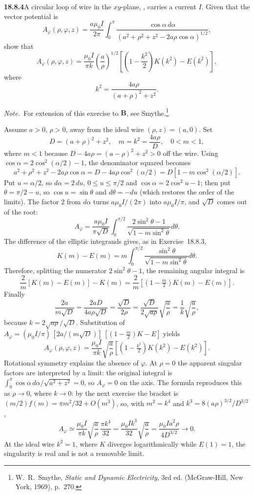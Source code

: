 \par\bigskip
\noindent\textbf{18.8.4}\quad A circular loop of wire in the
$xy$-plane, , carries a current $I$. Given
that the vector potential is
\[
A_{\varphi}(\rho,\varphi,z)
=\frac{a\mu_{0}I}{2\pi}\int_{0}^{\pi}
\frac{\cos\alpha\,d\alpha}
{(a^{2}+\rho^{2}+z^{2}-2a\rho\cos\alpha)^{1/2}},
\]
show that
\[
A_{\varphi}(\rho,\varphi,z)
=\frac{\mu_{0}I}{\pi k}\left(\frac{a}{\rho}\right)^{1/2}
\left[\left(1-\frac{k^{2}}{2}\right)K(k^{2})-E(k^{2})\right],
\]
where
\[
k^{2}=\frac{4a\rho}{(a+\rho)^{2}+z^{2}}.
\]
\par\emph{Note.}~For extension of this exercise to $\mathbf{B}$, see
Smythe.\footnote{W.~R.~Smythe, \emph{Static and Dynamic Electricity}, 3rd ed. (McGraw-Hill, New York, 1969), p.~270.}
\par\nobreak
\solution
Assume $a>0$, $\rho>0$, away from the ideal wire
$(\rho,z)=(a,0)$.  Set
\[
D=(a+\rho)^2+z^2,\quad m=k^2=\frac{4a\rho}D,
\quad 0<m<1,
\]
where $m<1$ because $D-4a\rho=(a-\rho)^2+z^2>0$ off the wire.
Using $\cos\alpha=2\cos^2(\alpha/2)-1$, the denominator
squared becomes
\[
a^2+\rho^2+z^2-2a\rho\cos\alpha
 =D-4a\rho\cos^2(\alpha/2)
 =D[1-m\cos^2(\alpha/2)].
\]
Put $u=\alpha/2$, so $d\alpha=2\,du$, $0\le u\le\pi/2$ and
$\cos\alpha=2\cos^2u-1$; then put $\theta=\pi/2-u$, so
$\cos u=\sin\theta$ and $d\theta=-du$ (which restores the order of
the limits).  The factor $2$ from $d\alpha$ turns
$a\mu_0I/(2\pi)$ into $a\mu_0I/\pi$, and $\sqrt D$ comes out of the
root:
\[
A_\varphi=\frac{a\mu_0 I}{\pi\sqrt D}
 \int_0^{\pi/2}\frac{2\sin^2\theta-1}
                         {\sqrt{1-m\sin^2\theta}}d\theta.
\]
The difference of the elliptic integrands gives, as in
Exercise~18.8.3,
\[
K(m)-E(m)=m\int_0^{\pi/2}
 \frac{\sin^2\theta}{\sqrt{1-m\sin^2\theta}}d\theta.
\]
Therefore, splitting the numerator $2\sin^2\theta-1$, the remaining
angular integral is
\[
\frac2m[K(m)-E(m)]-K(m)
 =\frac2m\left[(1-\tfrac m2)K(m)-E(m)\right].
\]
Finally
\[
\frac{2a}{m\sqrt D}
 =\frac{2aD}{4a\rho\sqrt D}=\frac{\sqrt D}{2\rho}
 =\frac{\sqrt D}{2\sqrt{a\rho}}\sqrt{\frac a\rho}
 =\frac1k\sqrt{\frac a\rho},
\]
because $k=2\sqrt{a\rho}/\sqrt D$.  Substitution of
$A_\varphi=(\mu_0I/\pi)\,[2a/(m\sqrt D)]\,
[(1-\tfrac m2)K-E]$ yields
\[
\boxed{A_\varphi(\rho,\varphi,z)=\frac{\mu_0I}{\pi k}
 \sqrt{\frac a\rho}
 \left[(1-\tfrac{k^2}2)K(k^2)-E(k^2)\right]}.
\]
Rotational symmetry explains the absence of $\varphi$.
At $\rho=0$ the apparent singular factors are interpreted
by a limit: the original integral is
$\int_0^\pi\cos\alpha\,d\alpha/\sqrt{a^2+z^2}=0$, so $A_\varphi=0$
on the axis.  The formula reproduces this as $\rho\to0$, where
$k\to0$: by the next exercise the bracket is
$(m/2)f(m)=\pi m^2/32+O(m^3)$, so, with $m^2=k^4$ and
$k^3=8(a\rho)^{3/2}/D^{3/2}$,
\[
A_\varphi\simeq\frac{\mu_0I}{\pi k}\sqrt{\frac a\rho}\,
 \frac{\pi k^4}{32}
 =\frac{\mu_0Ik^3}{32}\sqrt{\frac a\rho}
 =\frac{\mu_0Ia^2\rho}{4D^{3/2}}\to0.
\]  At the ideal wire
$k^2=1$, where $K$ diverges logarithmically while $E(1)=1$, the
singularity is real and is not a removable limit.

